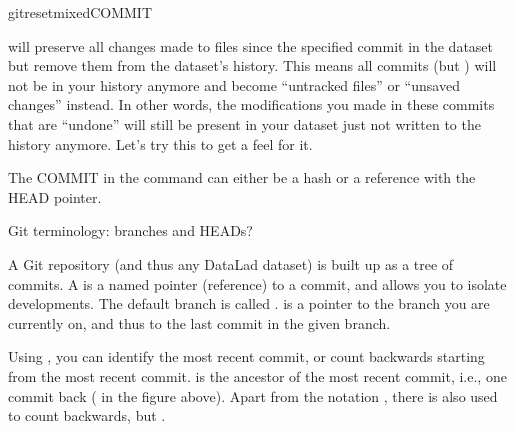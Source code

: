 \begin{sphinxVerbatim}[commandchars=\\\{\}]
gitreset\PYGZhy{}\PYGZhy{}mixedCOMMIT
\end{sphinxVerbatim}

\sphinxAtStartPar
will preserve all changes made to files since the specified
commit in the dataset but remove them from the dataset’s history.
This means all commits   (but  )
will not be in your history anymore and become “untracked files” or
“unsaved changes” instead. In other words, the modifications
you made in these commits that are “undone” will still be present
in your dataset \textendash{} just not written to the history anymore. Let’s
try this to get a feel for it.

\sphinxAtStartPar
The COMMIT in the command can either be a hash or a reference
with the HEAD pointer.

\ignorespaces \begin{findoutmore}[label={index-2}, before title={\thetcbcounter\ }, check odd page=true]{Git terminology: branches and HEADs?}
\label{\detokenize{basics/101-137-history:index-2}}

\sphinxAtStartPar
A Git repository (and thus any DataLad dataset) is built up as a tree of
commits. A  is a named pointer (reference) to a commit, and allows you
to isolate developments. The default branch is called .  is
a pointer to the branch you are currently on, and thus to the last commit
in the given branch.

\noindent{}

\sphinxAtStartPar
Using , you can identify the most recent commit, or count backwards
starting from the most recent commit.  is the ancestor of the most
recent commit, i.e., one commit back ( in the figure above). Apart from
the notation , there is also  used to count backwards, but
.


\end{findoutmore}

